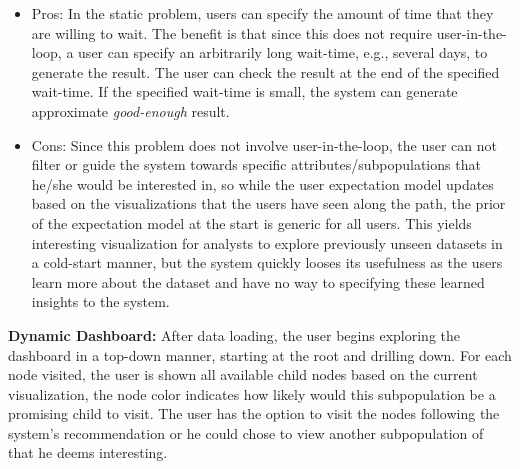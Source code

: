 \documentclass[11pt]{article}
\begin{document}
\begin{itemize}
\item Pros: In the static problem, users can specify the amount of time that they are willing to wait. The benefit is that since this does not require user-in-the-loop, a user can specify an arbitrarily long wait-time, e.g., several days, to generate the result. The user can check the result at the end of the specified wait-time. If the specified wait-time is small, the system can generate approximate \emph{good-enough} result.  

\item Cons: Since this problem does not involve user-in-the-loop, the user can not filter or guide the system towards specific attributes/subpopulations that he/she would be interested in, so while the user expectation model updates based on the visualizations that the users have seen along the path, the prior of the expectation model at the start is generic for all users. This yields interesting visualization for analysts to explore previously unseen datasets in a cold-start manner, but the system quickly looses its usefulness as the users learn more about the dataset and have no way to specifying these learned insights to the system.
\end{itemize}
\newline
\newline
\textbf{Dynamic Dashboard:}
 After data loading, the user begins exploring the dashboard in a top-down manner, starting at the root and drilling down.  For each node visited, the user is shown all available child nodes based on the current visualization, the node color indicates how likely would this subpopulation be a promising child to visit. The user has the option to visit the nodes following the system's recommendation or he could chose to view another subpopulation of that he deems interesting.
 
\end{document}
